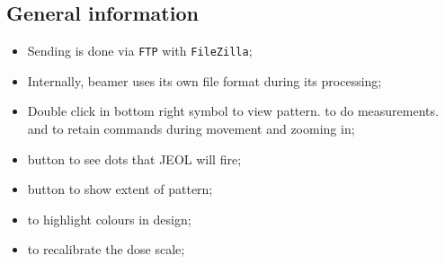 \subsection{General information}
\begin{itemize}
\item Sending is done via \verb|FTP| with \texttt{FileZilla};
\item  Internally,  beamer  uses  its  own  file  format  during  its
  processing;
\item  Double  click   in  bottom  right  symbol   to  view  pattern.
    to   do  measurements.     and
   to retain commands during movement and zooming in;
\item {} button to see dots that JEOL will fire;
\item {} button to show extent of pattern;
\item {} to highlight colours in design;
\item {}  to recalibrate the
  dose scale;
\end{itemize}

